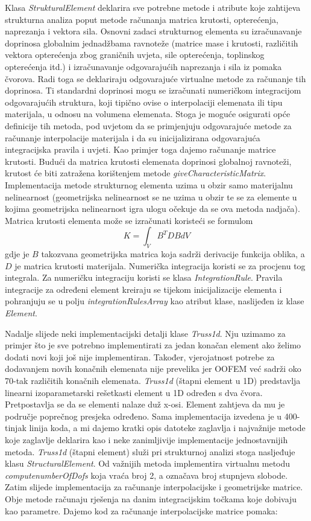 \documentclass[a4paper,twoside,12pt]{memoir} %
\begin{document}
Klasa \textit{StrukturalElement} deklarira sve potrebne metode i atribute koje zahtijeva strukturna analiza poput metode računanja matrica krutosti, opterećenja, naprezanja i vektora sila. 
Osnovni zadaci strukturnog elementa su izračunavanje doprinosa globalnim jednadžbama ravnoteže (matrice mase i krutosti, različitih vektora opterećenja zbog graničnih uvjeta, sile opterećenja, toplinskog opterećenja itd.) i izračunavanje odgovarajućih naprezanja i sila iz pomaka čvorova. Radi toga se deklariraju odgovarajuće virtualne metode za računanje tih doprinosa. Ti standardni doprinosi mogu se izračunati numeričkom integracijom odgovarajućih struktura, koji tipično ovise o interpolaciji elemenata ili tipu materijala, u odnosu na volumena elemenata. Stoga je moguće osigurati opće definicije tih metoda, pod uvjetom da se primjenjuju odgovarajuće metode za računanje interpolacije materijala i da su inicijalizirana odgovarajuća integracijska pravila i uvjeti. Kao primjer toga dajemo računanje matrice krutosti. Budući da matrica krutosti elemenata doprinosi globalnoj ravnoteži, krutost će biti zatražena korištenjem metode \textit{giveCharacteristicMatrix}. Implementacija metode strukturnog elementa uzima u obzir samo materijalnu nelinearnost (geometrijska nelinearnost se ne uzima u obzir te se za elemente u kojima geometrijska nelinearnost igra ulogu očekuje da se ova metoda nadjača). Matrica krutosti elementa može se izračunati koristeći se formulom
$$ K = \int_V B^T D B dV $$
gdje je $B$ takozvana geometrijska matrica koja sadrži derivacije funkcija oblika, a $D$ je matrica krutosti materijala. Numerička integracija koristi se za procjenu tog integrala. Za numeričku integraciju koristi se klasa \textit{IntegrationRule}. Pravila integracije za određeni element kreiraju se tijekom inicijalizacije elementa i pohranjuju se u polju \textit{integrationRulesArray} kao atribut klase, naslijeđen iz klase \textit{Element}. \par

Nadalje slijede neki implementacijski detalji klase \textit{Truss1d}. Nju uzimamo za primjer što je sve potrebno implementirati za jedan konačan element ako želimo dodati novi koji još nije implementiran. Također, vjerojatnost potrebe za dodavanjem novih konačnih elemenata nije prevelika jer OOFEM već sadrži oko 70-tak različitih konačnih elemenata. \textit{Truss1d} (štapni element u 1D) predstavlja linearni izoparametarski rešetkasti element u 1D određen s dva čvora. Pretpostavlja se da se elementi nalaze duž x-osi. Element zahtjeva da mu je područje poprečnog presjeka određeno. Sama implementacija izvedena je u 400-tinjak linija koda, a mi dajemo kratki opis datoteke zaglavlja i najvažnije metode koje zaglavlje deklarira kao i neke zanimljivije implementacije jednostavnijih metoda. \textit{Truss1d} (štapni element) služi pri strukturnoj analizi stoga nasljeđuje klasu \textit{StructuralElement}. Od važnijih metoda implementira virtualnu metodu \textit{computenumberOfDofs} koja vraća broj 2, a označava broj stupnjeva slobode. Zatim slijede implementacija za računanje interpolacijske i geometrijske matrice. Obje metode računaju rješenja na danim integracijskim točkama koje dobivaju kao parametre. Dajemo kod za računanje interpolacijske matrice pomaka:
\end{document}
